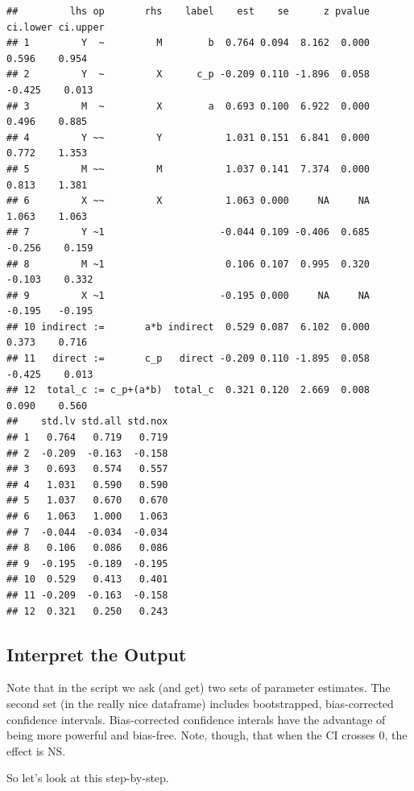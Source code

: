 \documentclass[
  11pt,
]{book}
\begin{document}
\begin{verbatim}
##         lhs op       rhs    label    est    se      z pvalue ci.lower ci.upper
## 1         Y  ~         M        b  0.764 0.094  8.162  0.000    0.596    0.954
## 2         Y  ~         X      c_p -0.209 0.110 -1.896  0.058   -0.425    0.013
## 3         M  ~         X        a  0.693 0.100  6.922  0.000    0.496    0.885
## 4         Y ~~         Y           1.031 0.151  6.841  0.000    0.772    1.353
## 5         M ~~         M           1.037 0.141  7.374  0.000    0.813    1.381
## 6         X ~~         X           1.063 0.000     NA     NA    1.063    1.063
## 7         Y ~1                    -0.044 0.109 -0.406  0.685   -0.256    0.159
## 8         M ~1                     0.106 0.107  0.995  0.320   -0.103    0.332
## 9         X ~1                    -0.195 0.000     NA     NA   -0.195   -0.195
## 10 indirect :=       a*b indirect  0.529 0.087  6.102  0.000    0.373    0.716
## 11   direct :=       c_p   direct -0.209 0.110 -1.895  0.058   -0.425    0.013
## 12  total_c := c_p+(a*b)  total_c  0.321 0.120  2.669  0.008    0.090    0.560
##    std.lv std.all std.nox
## 1   0.764   0.719   0.719
## 2  -0.209  -0.163  -0.158
## 3   0.693   0.574   0.557
## 4   1.031   0.590   0.590
## 5   1.037   0.670   0.670
## 6   1.063   1.000   1.063
## 7  -0.044  -0.034  -0.034
## 8   0.106   0.086   0.086
## 9  -0.195  -0.189  -0.195
## 10  0.529   0.413   0.401
## 11 -0.209  -0.163  -0.158
## 12  0.321   0.250   0.243
\end{verbatim}

\hypertarget{interpret-the-output}{%
\subsection{Interpret the Output}\label{interpret-the-output}}

Note that in the script we ask (and get) two sets of parameter estimates. The second set (in the really nice dataframe) includes bootstrapped, bias-corrected confidence intervals. Bias-corrected confidence interals have the advantage of being more powerful and bias-free. Note, though, that when the CI crosses 0, the effect is NS.

So let's look at this step-by-step.
\end{document}
